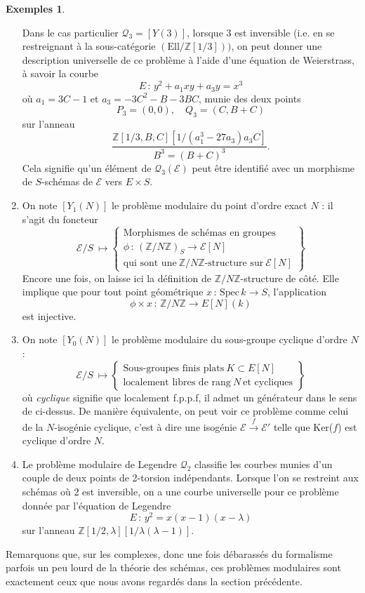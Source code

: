 \documentclass[11pt,a4paper]{article}
\newcommand{\Z}{\mathbb{Z}}
\newcommand{\E}{\mathcal{E}}
\newcommand{\Qr}{\mathcal{Q}}
\newcommand{\vers}{\longrightarrow}
\newcommand{\Ell}{\mathrm{Ell}}
\newcommand{\Spec}{\mathrm{Spec}\,}
\newcommand{\de}{\,:\,}
\theoremstyle{definition}
\newtheorem*{ex}{Exemples}
\begin{document}
\begin{ex}
\begin{enumerate}
Dans le cas particulier $\Qr_3 = [Y(3)]$, lorsque 3 est inversible (i.e. en se restreignant à la sous-catégorie $(\Ell/\Z[1/3]))$, on peut donner une description universelle de ce problème à l'aide d'une équation de Weierstrass, à savoir la courbe
$$E\de y^2 + a_1 x y + a_3 y = x^3$$
où $a_1 = 3C - 1$ et $a_3 = -3 C^2 - B - 3 BC$, munie des deux points
$$P_3 = (0,0), \quad Q_3 = (C, B+C)$$
sur l'anneau
$$\frac{\Z[1/3, B, C][1/(a_1^3 - 27 a_3)a_3 C]}{B^3 = (B+C)^3}.$$
Cela signifie qu'un élément de $\Qr_3(\E)$ peut être identifié avec un morphisme de $S$-schémas de $\E$ vers $E\times S$.
\item On note $[Y_1(N)]$ le problème modulaire du point d'ordre exact $N$ : il s'agit du foncteur
$$ \E/S\ \longmapsto \left\{
\begin{matrix}
\text{Morphismes\ de\ schémas\ en\ groupes}\\
\phi\de (\Z/N\Z)_S\vers \E[N]\ \\
\text{qui\ sont\ une}\ \Z/N\Z \text{-structure\ sur}\ \E[N]
\end{matrix}
\right\}$$
Encore une fois, on laisse ici la définition de $\Z/N\Z$-structure de côté. Elle implique que pour tout point géométrique $x\de\Spec k\vers S$, l'application
$$\phi \times x\de \Z/N\Z \vers E[N](k)$$
est injective.
\item On note $[Y_0(N)]$ le problème modulaire du sous-groupe cyclique d'ordre $N$ :
$$ \E/S\ \longmapsto \left\{
\begin{matrix}
\text{Sous-groupes finis plats}\ K\subset E[N]\\
 \text{localement libres de rang}\ N\ \text{et cycliques}
\end{matrix}
\right\}$$
où \emph{cyclique} signifie que localement f.p.p.f, il admet un générateur dans le sens de ci-dessus. De manière équivalente, on peut voir ce problème comme celui de la $N$-isogénie cyclique, c'est à dire une isogénie $\E \overset{f}{\vers} \E'$ telle que Ker($f$) est cyclique d'ordre $N$.
\item Le problème modulaire de Legendre $\Qr_2$ classifie les courbes munies d'un couple de deux points de 2-torsion indépendants. Lorsque l'on se restreint aux schémas où 2 est inversible, on a une courbe universelle pour ce problème donnée par l'équation de Legendre
$$ E\de y^2 = x (x-1) (x-\lambda)$$
sur l'anneau $\Z[1/2,\lambda][1/\lambda(\lambda -1)].$
\end{enumerate}
\end{ex}

Remarquons que, sur les complexes, donc une fois débarassés du formalisme parfois un peu lourd de la théorie des schémas, ces problèmes modulaires sont exactement ceux que nous avons regardés dans la section précédente.
\end{document}
